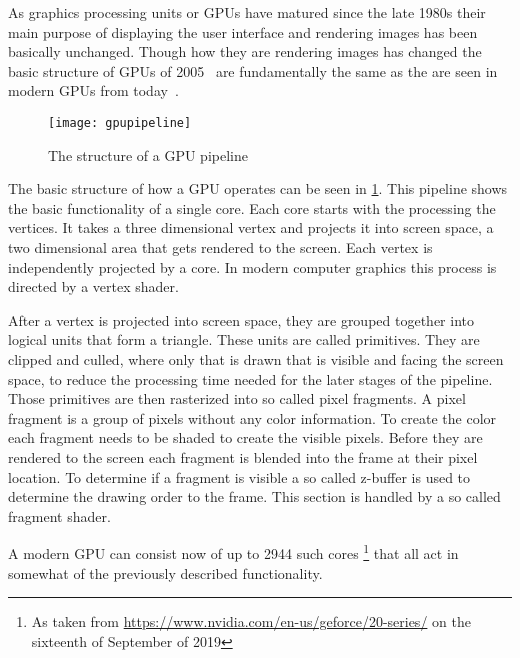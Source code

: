 
As graphics processing units or GPUs have matured since the late 1980s their main purpose of displaying the user interface and rendering images has been basically unchanged. Though how they are rendering images has changed the basic structure of GPUs of 2005~\cite{kilgariff2005geforce} are fundamentally the same as the are seen in modern GPUs from today~\cite{nvidia2018turing}.

\begin{figure}[H]
	\centering
	\texttt{[image: gpupipeline]}
	\caption{The structure of a GPU pipeline}
	\label{img:gpuPipe}
\end{figure}

The basic structure of how a GPU operates can be seen in \cref{img:gpuPipe}. This pipeline shows the basic functionality of a single core. Each core starts with the processing the vertices. It takes a three dimensional vertex and projects it into screen space, a two dimensional area that gets rendered to the screen. Each vertex is independently projected by a core. In modern computer graphics this process is directed by a vertex shader.

After a vertex is projected into screen space, they are grouped together into logical units that form a triangle. These units are called primitives. They are clipped and culled, where only that is drawn that is visible and facing the screen space, to reduce the processing time needed for the later stages of the pipeline. Those primitives are then rasterized into so called pixel fragments. A pixel fragment is a group of pixels without any color information. To create the color each fragment needs to be shaded to create the visible pixels. Before they are rendered to the screen each fragment is blended into the frame at their pixel location. To determine if a fragment is visible a so called z-buffer is used to determine the drawing order to the frame. This section is handled by a so called fragment shader. 

A modern GPU can consist now of up to 2944 such cores \footnote{As taken from \url{https://www.nvidia.com/en-us/geforce/20-series/} on the sixteenth of September of 2019} that all act in somewhat of the previously described functionality.

